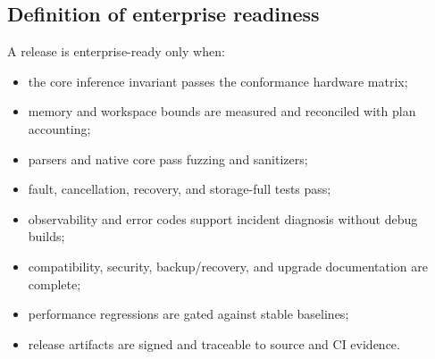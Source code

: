 \subsection{Definition of enterprise readiness}

A release is enterprise-ready only when:

\begin{itemize}
  \item the core inference invariant passes the conformance hardware matrix;
  \item memory and workspace bounds are measured and reconciled with plan accounting;
  \item parsers and native core pass fuzzing and sanitizers;
  \item fault, cancellation, recovery, and storage-full tests pass;
  \item observability and error codes support incident diagnosis without debug builds;
  \item compatibility, security, backup/recovery, and upgrade documentation are complete;
  \item performance regressions are gated against stable baselines;
  \item release artifacts are signed and traceable to source and CI evidence.
\end{itemize}
